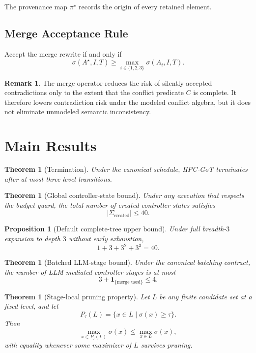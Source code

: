 \documentclass[11pt,a4paper]{article}
\numberwithin{equation}{section}
\newtheorem{theorem}[axiom]{Theorem}
\newtheorem{proposition}[axiom]{Proposition}
\theoremstyle{definition}
\newtheorem{remark}[axiom]{Remark}
\newcommand{\States}{\Sigma}
\begin{document}
The provenance map \(\pi^\star\) records the origin of every retained element.

\subsection{Merge Acceptance Rule}

Accept the merge rewrite if and only if
\[
\sigma(A^\star,I,T)\ge \max_{i\in\{1,2,3\}}\sigma(A_i,I,T).
\]

\begin{remark}
The merge operator reduces the risk of silently accepted contradictions only to the extent that the conflict predicate \(C\) is complete. It therefore lowers contradiction risk under the modeled conflict algebra, but it does not eliminate unmodeled semantic inconsistency.
\end{remark}

\section{Main Results}

\begin{theorem}[Termination]
Under the canonical schedule, HPC-GoT terminates after at most three level transitions.
\end{theorem}

\begin{theorem}[Global controller-state bound]
Under any execution that respects the budget guard, the total number of created controller states satisfies
\[
|\States_{\mathrm{created}}|\le 40.
\]
\end{theorem}

\begin{proposition}[Default complete-tree upper bound]
Under full breadth-\(3\) expansion to depth \(3\) without early exhaustion,
\[
1+3+3^2+3^3 = 40.
\]
\end{proposition}

\begin{theorem}[Batched LLM-stage bound]
Under the canonical batching contract, the number of LLM-mediated controller stages is at most
\[
3+\mathbf{1}_{\{\text{merge used}\}}\le 4.
\]
\end{theorem}

\begin{theorem}[Stage-local pruning property]
Let \(L\) be any finite candidate set at a fixed level, and let
\[
P_\tau(L)=\{x\in L\mid \sigma(x)\ge \tau\}.
\]
Then
\[
\max_{x\in P_\tau(L)}\sigma(x)\le \max_{x\in L}\sigma(x),
\]
with equality whenever some maximizer of \(L\) survives pruning.
\end{theorem}
\end{document}
